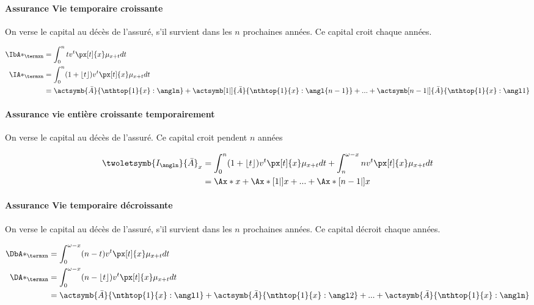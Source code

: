 \documentclass[10pt, french]{article}
\begin{document}
\begin{multicols*}{3}
\paragraph{Assurance Vie temporaire croissante} On verse le capital au décès de l'assuré, s'il survient dans les $n$ prochaines années. Ce capital croit chaque années.

\begin{align*}
	\IbA*_{\termxn} &= \int_0^n t v^t \px[t]{x} \mu_{x+t} dt \\
	\IA*_{\termxn}  &= \int_0^n (1 + \lfloor t \rfloor) v^t \px[t]{x} \mu_{x+t} dt \\
		&= \actsymb{\bar{A}}{\nthtop{1}{x}:\angln} + \actsymb[1|]{\bar{A}}{\nthtop{1}{x}:\angl{n-1}} + ... + \actsymb[n-1|]{\bar{A}}{\nthtop{1}{x}:\angl1}
\end{align*}

\paragraph{Assurance vie entière croissante temporairement} On verse le capital au décès de l'assuré. Ce capital croit pendent $n$ années

\begin{align*}
	\twoletsymb{I_{\angln}}{\bar{A}}_{x}  &= \int_0^n (1 + \lfloor t \rfloor) v^t \px[t]{x} \mu_{x+t} dt + \int_n^{\omega - x} n v^t \px[t]{x} \mu_{x+t} dt \\
		&= \Ax*{x} + \Ax*[1|]{x} + ... + \Ax*[n-1|]{x}
\end{align*}

\paragraph{Assurance Vie temporaire décroissante} On verse le capital au décès de l'assuré, s'il survient dans les $n$ prochaines années. Ce capital décroit chaque années.

\begin{align*}
	\DbA*_{\termxn} &= \int_0^{\omega - x} (n - t) v^t \px[t]{x} \mu_{x+t} dt \\
	\DA*_{\termxn}  &= \int_0^{\omega - x} (n - \lfloor t \rfloor) v^t \px[t]{x} \mu_{x+t} dt \\
		&= \actsymb{\bar{A}}{\nthtop{1}{x}:\angl1} + \actsymb{\bar{A}}{\nthtop{1}{x}:\angl2} + ... + \actsymb{\bar{A}}{\nthtop{1}{x}:\angln}
\end{align*}



\end{multicols*}
\end{document}
